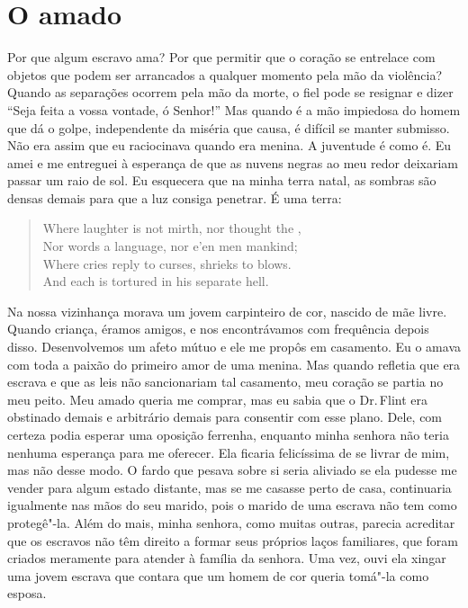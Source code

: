 \chapter*{O amado}

Por que algum escravo ama? Por que
permitir que o coração se entrelace com objetos que podem ser arrancados
a qualquer momento pela mão da violência? Quando as separações ocorrem
pela mão da morte, o fiel pode se resignar e dizer ``Seja feita a vossa
vontade, ó Senhor!'' Mas quando é a mão impiedosa do homem que dá o
golpe, independente da miséria que causa, é difícil se manter submisso.
Não era assim que eu raciocinava quando era menina. A juventude é como
é. Eu amei e me entreguei à esperança de que as nuvens negras ao meu
redor deixariam passar um raio de sol. Eu esquecera que na minha terra
natal, as sombras são densas demais para que a luz consiga penetrar. É
uma terra:

\begin{verse}
Where laughter is not mirth, nor thought the ,\\
Nor words a language, nor e'en men mankind;\\
Where cries reply to curses, shrieks to blows.\\
And each is tortured in his separate hell.\footnotemark
\end{verse}

Na nossa vizinhança morava um jovem
carpinteiro de cor, nascido de mãe livre. Quando criança, éramos amigos,
e nos encontrávamos com frequência depois disso. Desenvolvemos um afeto
mútuo e ele me propôs em casamento. Eu o amava com toda a paixão do
primeiro amor de uma menina. Mas quando refletia que era escrava e que
as leis não sancionariam tal casamento, meu coração se partia no meu
peito. Meu amado queria me comprar, mas eu sabia que o Dr.\,Flint era
obstinado demais e arbitrário demais para consentir com esse plano.
Dele, com certeza podia esperar uma oposição ferrenha, enquanto minha
senhora não teria nenhuma esperança para me oferecer. Ela ficaria
felicíssima de se livrar de mim, mas não desse modo. O fardo que pesava
sobre si seria aliviado se ela pudesse me vender para algum estado
distante, mas se me casasse perto de casa, continuaria igualmente nas
mãos do seu marido, pois o marido de uma escrava não tem como
protegê"-la. Além do mais, minha senhora, como muitas outras, parecia
acreditar que os escravos não têm direito a formar seus próprios laços
familiares, que foram criados meramente para atender à família da
senhora. Uma vez, ouvi ela xingar uma jovem escrava que contara que um
homem de cor queria tomá"-la como esposa.

